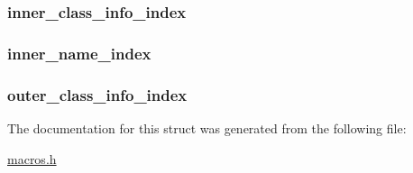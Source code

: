 \subsubsection[{inner\+\_\+class\+\_\+info\+\_\+index}]{ inner\+\_\+class\+\_\+info\+\_\+index}\label{struct_classes_for_i_classes_a84a9a6c8c14f8900137a8f51b446d6c2}
\hypertarget{struct_classes_for_i_classes_ac792b66aa74db5d300bf22502fb49ef1}{}
\subsubsection[{inner\+\_\+name\+\_\+index}]{ inner\+\_\+name\+\_\+index}\label{struct_classes_for_i_classes_ac792b66aa74db5d300bf22502fb49ef1}
\hypertarget{struct_classes_for_i_classes_a3b7a87f79f7ea8908d258f19b237bec2}{}
\subsubsection[{outer\+\_\+class\+\_\+info\+\_\+index}]{ outer\+\_\+class\+\_\+info\+\_\+index}\label{struct_classes_for_i_classes_a3b7a87f79f7ea8908d258f19b237bec2}


The documentation for this struct was generated from the following file\+:\begin{DoxyCompactItemize}
\item 
\hyperlink{macros_8h}{macros.\+h}\end{DoxyCompactItemize}
